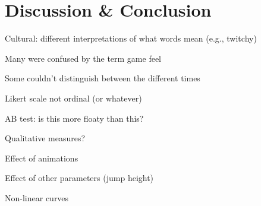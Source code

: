 \section{Discussion \& Conclusion} \label{discussion}
Cultural: different interpretations of what words mean (e.g., twitchy)

Many were confused by the term game feel

Some couldn't distinguish between the different times

Likert scale not ordinal (or whatever)

AB test: is this more floaty than this?

Qualitative measures?

Effect of animations

Effect of other parameters (jump height)

Non-linear curves

